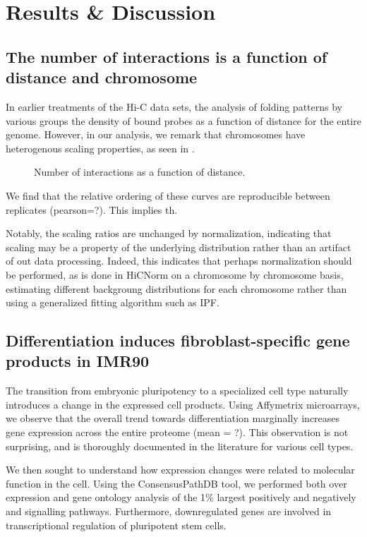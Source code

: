 
\chapter{Results \& Discussion}

\section*{The number of interactions is a function of distance and chromosome}
In earlier treatments of the Hi-C data sets, the analysis of folding patterns by various groups\cite{imakaev2009}\cite{ren2012}
the density of bound probes as a function of distance for the entire genome.  However, in our analysis, we remark that chromosomes
have heterogenous scaling properties, as seen in .  

\begin{figure}[ht]
  \caption{Number of interactions as a function of distance.}
\end{figure}

We find that the relative ordering of these curves are reproducible between replicates (pearson=?).  This implies th.

Notably, the scaling ratios are unchanged by normalization, indicating that scaling may be a property of the underlying distribution
rather than an artifact of out data processing.  Indeed, this indicates that perhaps normalization should be performed, as is
done in HiCNorm\cite{} on a chromosome by chromosome basis, estimating different backgroung distributions for each chromosome
rather than using a generalized fitting algorithm such as IPF.


\section*{Differentiation induces fibroblast-specific gene products in IMR90}

The transition from embryonic pluripotency to a specialized cell type naturally introduces a change in the expressed cell products.
Using Affymetrix microarrays, we observe that the overall trend towards differentiation marginally increases gene expression across
the entire proteome (mean = ?).  This observation is not surprising, and is thoroughly documented in the literature\cite{tuomela2012}
for various cell types.

We then sought to understand how expression changes were related to molecular function in the cell.  Using the ConsensusPathDB
tool\cite{kamburov2012}, we performed both over expression and gene ontology analysis of the 1\%  largest positively and negatively
and signalling pathways.  Furthermore, downregulated genes are involved in transcriptional regulation of pluripotent stem cells.

